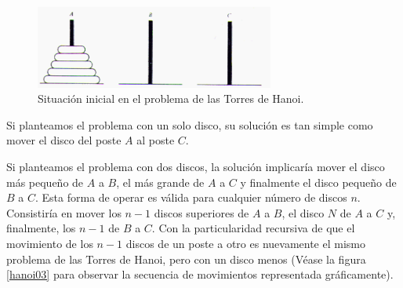 \documentclass[a4paper, 11pt, titlepage]{article}
\begin{document}
                    \begin{figure}[htp]
                        \centering
                        \includegraphics[width=0.7\textwidth]{resources/recursividad03.png}
                        \caption{Situación inicial en el problema de las Torres de Hanoi.}
                        \label{hanoi01}
                    \end{figure}
            
                    Si planteamos el problema con un solo disco, su solución es tan simple como mover 
                    el disco del poste $A$ al poste $C$.

                    Si planteamos el problema con dos discos, la solución implicaría mover el disco 
                    más pequeño de $A$ a $B$, el más grande de $A$ a $C$ y finalmente el disco pequeño 
                    de $B$ a $C$. Esta forma de operar es válida para cualquier número de discos $n$. 
                    Consistiría en mover los $n-1$ discos superiores de $A$ a $B$, el disco $N$ de 
                    $A$ a $C$ y, finalmente, los $n-1$ de $B$ a $C$. Con la particularidad recursiva de 
                    que el movimiento de los $n-1$ discos de un poste a otro es nuevamente el mismo 
                    problema de las Torres de Hanoi, pero con un disco menos (Véase la figura \ref{hanoi03}
                    para observar la secuencia de movimientos representada gráficamente).
\end{document}
